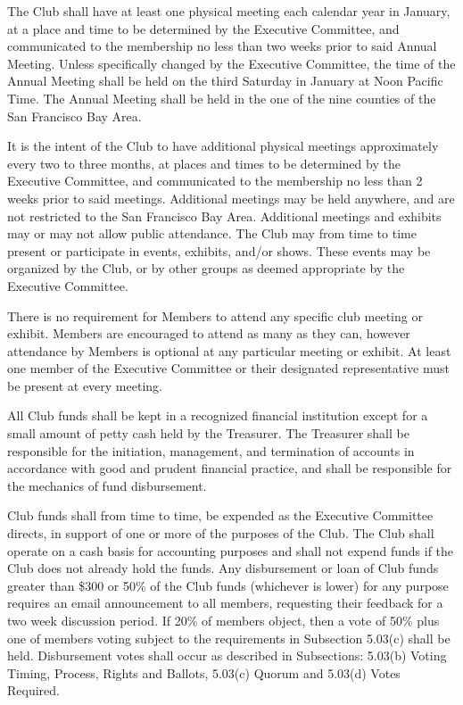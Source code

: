 \documentclass{bylaws}
\begin{document}
The Club shall have at least one physical meeting each calendar year in January, at a place and time to be determined by the Executive Committee, and communicated to the membership no less than two weeks prior to said Annual Meeting. Unless specifically changed by the Executive Committee, the time of the Annual Meeting shall be held on the third Saturday in January at Noon Pacific Time. The Annual Meeting shall be held in the one of the nine counties of the San Francisco Bay Area. 

It is the intent of the Club to have additional physical meetings approximately every two to three months, at places and times to be determined by the Executive Committee, and communicated to the membership no less than 2 weeks prior to said meetings. Additional meetings may be held anywhere, and are not restricted to the San Francisco Bay Area. Additional meetings and exhibits may or may not allow public attendance. The Club may from time to time present or participate in events, exhibits, and/or shows. These events may be organized by the Club, or by other groups as deemed appropriate by the Executive Committee. 

There is no requirement for Members to attend any specific club meeting or exhibit. Members are encouraged to attend as many as they can, however attendance by Members is optional at any particular meeting or exhibit. At least one member of the Executive Committee or their designated representative must be present at every meeting. 



All Club funds shall be kept in a recognized financial institution except for a small amount of petty cash held by the Treasurer. The Treasurer shall be responsible for the initiation, management, and termination of accounts in accordance with good and prudent financial practice, and shall be responsible for the mechanics of fund disbursement. 

Club funds shall from time to time, be expended as the Executive Committee directs, in support of one or more of the purposes of the Club. The Club shall operate on a cash basis for accounting purposes and shall not expend funds if the Club does not already hold the funds. Any disbursement or loan of Club 
funds greater than \$300 or 50\% of the Club funds (whichever is lower) for any purpose requires an email announcement to all members, requesting their feedback for a two week discussion period. If 20\% of members object, then a vote of 50\% plus one of members voting subject to the requirements in Subsection 5.03(c) shall be held. Disbursement votes shall occur as described in Subsections: 5.03(b) Voting Timing, Process, Rights and Ballots, 5.03(c) Quorum and 5.03(d) Votes Required. 
\end{document}
